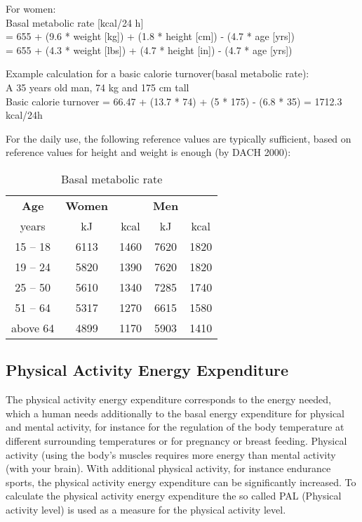 \documentclass[../main.tex]{subfiles}
\begin{document}
\vspace{3mm}

\noindent For women:\\
Basal metabolic rate  [kcal/24 h] \\
= 655 + (9.6 * weight [kg]) + (1.8 * height [cm]) - (4.7 * age [yrs]) \\
= 655 + (4.3 * weight [lbs]) + (4.7 * height [in]) - (4.7 * age [yrs])

\vspace{3mm}

\noindent Example calculation for a basic calorie turnover(basal metabolic rate):\\
A 35 years old man, 74 kg and 175 cm tall\\
Basic calorie turnover = 66.47 + (13.7 * 74) + (5 * 175) - (6.8 * 35) = 1712.3 kcal/24h

\vspace{3mm}

For the daily use, the following reference values are typically sufficient,
based on reference values for height and weight is enough (by DACH 2000):

\begin{table}[htb]
  \centering
  \begin{tabular}{c|c c|c c}
    \textbf{Age} & \textbf{Women} & & \textbf{Men} \\
    years & kJ & kcal & kJ & kcal \\
    \hline
    15 -- 18 & 6113 & 1460 & 7620 & 1820 \\
    19 -- 24 & 5820 & 1390 & 7620 & 1820 \\
    25 -- 50 & 5610 & 1340 & 7285 & 1740 \\
    51 -- 64 & 5317 & 1270 & 6615 & 1580 \\
    above 64 & 4899 & 1170 & 5903 & 1410 \\
  \end{tabular}
  \caption{Basal metabolic rate}
\end{table}

\subsection{Physical Activity Energy Expenditure}

The physical activity energy expenditure corresponds to the energy needed, which a human needs additionally to the basal energy expenditure for physical and mental activity, for instance for the regulation of the body temperature at different surrounding temperatures or for pregnancy or breast feeding.
Physical activity (using the body's muscles requires more energy than mental activity (with your brain). With additional physical activity, for instance endurance sports, the physical activity energy expenditure can be significantly increased.
To calculate the physical activity energy expenditure the so called PAL (Physical activity level) is used as a measure for the physical activity level.
\end{document}
